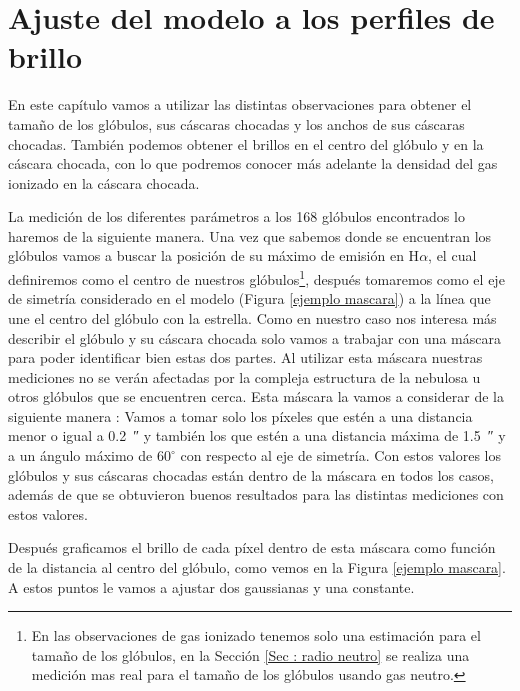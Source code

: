\documentclass{book}
\begin{document}
\chapter{Ajuste del modelo a los perfiles de brillo}\label{Chapter : Ajuste}

En este capítulo vamos a utilizar las distintas observaciones para obtener el tamaño de los glóbulos, sus cáscaras chocadas y los anchos de sus cáscaras chocadas. También podemos obtener el brillos en el centro del glóbulo y en la cáscara chocada, con lo que podremos conocer más adelante la densidad del gas ionizado en la cáscara chocada.

La medición de los diferentes parámetros a los 168 glóbulos encontrados lo haremos de la siguiente manera. Una vez que sabemos donde se encuentran los glóbulos vamos a buscar la posición de su máximo de emisión en H$\alpha$, el cual definiremos como el centro de nuestros glóbulos\footnote{En las observaciones de gas ionizado tenemos solo una estimación para el tamaño de los glóbulos, en la Sección \ref{Sec : radio neutro} se realiza una medición mas real para el tamaño de los glóbulos usando gas neutro.}, después tomaremos como el eje de simetría considerado en el modelo (Figura \ref{ejemplo mascara}) a la línea que une el centro del glóbulo con la estrella. Como en nuestro caso nos interesa más describir el glóbulo y su cáscara chocada solo vamos a trabajar con una máscara para poder identificar bien estas dos partes. Al utilizar esta máscara nuestras mediciones no se verán afectadas por la compleja estructura de la nebulosa u otros glóbulos que se encuentren cerca. Esta máscara la vamos a considerar de la siguiente manera : Vamos a tomar solo los píxeles que estén a una distancia menor o igual a \SI{0.2}{\arcsecond} y también los que estén a una distancia máxima de \SI{1.5}{\arcsecond} y a un ángulo máximo de $60^\circ$ con respecto al eje de simetría. Con estos valores los glóbulos y sus cáscaras chocadas están dentro de la máscara en todos los casos, además de que se obtuvieron buenos resultados para las distintas mediciones con estos valores.

Después graficamos el brillo de cada píxel dentro de esta máscara como función de la distancia al centro del glóbulo, como vemos en la Figura \ref{ejemplo mascara}. A estos puntos le vamos a ajustar dos gaussianas y una constante.
\end{document}

